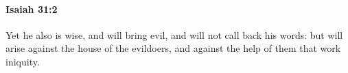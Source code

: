 
		\paragraph{Isaiah 31:2} %
			\label{ISAIAH-31-2}

			Yet he also is wise, and will bring evil, and will not call back his words: but will arise against the house of the evildoers, and against the help of them that work iniquity.


